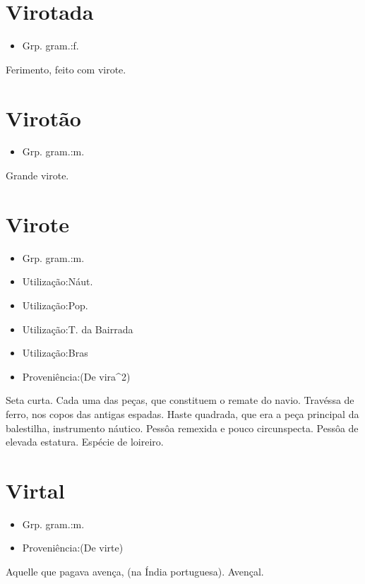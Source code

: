 \documentclass{article}
\begin{document}
\section{Virotada}
\begin{itemize}
\item {Grp. gram.:f.}
\end{itemize}
Ferimento, feito com virote.
\section{Virotão}
\begin{itemize}
\item {Grp. gram.:m.}
\end{itemize}
Grande virote.
\section{Virote}
\begin{itemize}
\item {Grp. gram.:m.}
\end{itemize}
\begin{itemize}
\item {Utilização:Náut.}
\end{itemize}
\begin{itemize}
\item {Utilização:Pop.}
\end{itemize}
\begin{itemize}
\item {Utilização:T. da Bairrada}
\end{itemize}
\begin{itemize}
\item {Utilização:Bras}
\end{itemize}
\begin{itemize}
\item {Proveniência:(De \textunderscore vira\textunderscore ^2)}
\end{itemize}
Seta curta.
Cada uma das peças, que constituem o remate do navio.
Travéssa de ferro, nos copos das antigas espadas.
Haste quadrada, que era a peça principal da balestilha, instrumento náutico.
Pessôa remexida e pouco circunspecta.
Pessôa de elevada estatura.
Espécie de loireiro.
\section{Virtal}
\begin{itemize}
\item {Grp. gram.:m.}
\end{itemize}
\begin{itemize}
\item {Proveniência:(De \textunderscore virte\textunderscore )}
\end{itemize}
Aquelle que pagava avença, (na Índia portuguesa).
Avençal.
\end{document}
